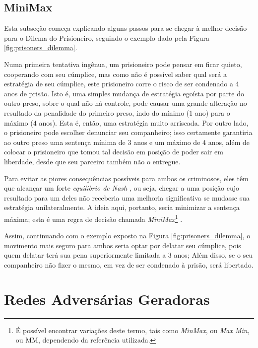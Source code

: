 \subsection{MiniMax}
\label{subsec:gan_minmax}

Esta subseção começa explicando alguns passos para se chegar à melhor decisão para o Dilema do Prisioneiro, seguindo o exemplo dado pela Figura \ref{fig:prisoners_dilemma}.

Numa primeira tentativa ingênua, um prisioneiro pode pensar em ficar quieto, cooperando com seu cúmplice, mas como não é possível saber qual será a estratégia de seu cúmplice, este prisioneiro corre o risco de ser condenado a 4 anos de prisão. Isto é, uma simples mudança de estratégia egoísta por parte do outro preso, sobre o qual não há controle, pode causar uma grande alteração no resultado da penalidade do primeiro preso, indo do mínimo (1 ano) para o máximo (4 anos). Esta é, então, uma estratégia muito arriscada. Por outro lado, o prisioneiro pode escolher denunciar seu companheiro; isso certamente garantiria ao outro preso uma sentença mínima de 3 anos e um máximo de 4 anos, além de colocar o prisioneiro que tomou tal decisão em posição de poder sair em liberdade, desde que seu parceiro também não o entregue.

Para evitar as piores consequências possíveis para ambos os criminosos, eles têm que alcançar um forte \textit{equilíbrio de Nash} \citep{Nash48}, ou seja, chegar a uma posição cujo resultado para um deles não receberia uma melhoria significativa se mudasse sua estratégia unilateralmente. A ideia aqui, portanto, seria minimizar a sentença máxima; esta é uma regra de decisão chamada \textit{MiniMax}\footnote{É possível encontrar variações deste termo, tais como \textit{MinMax}, ou \textit{Max Min}, ou MM, dependendo da referência utilizada.} \citep{v.Neumann1928, blackwell1956analog, willem1997minimax}.

Assim, continuando com o exemplo exposto na Figura \ref{fig:prisoners_dilemma}, o movimento mais seguro para ambos seria optar por delatar seu cúmplice, pois quem delatar terá sua pena superiormente limitada a 3 anos; Além disso, se o seu companheiro não fizer o mesmo, em vez de ser condenado à prisão, será libertado.



\section{Redes Adversárias Geradoras}
\label{sec:gan_gan}


